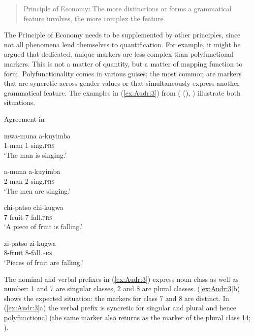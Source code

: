 \documentclass[output=collectionpaper]{langsci/langscibook}
\begin{document}
\begin{quote}
Principle of Economy: The more distinctions or forms a grammatical feature involves, the more complex the feature.
\end{quote}

The Principle of Economy needs to be supplemented by other principles, since not all phenomena lend themselves to quantification. For example, it might be argued that dedicated, unique markers are less complex than polyfunctional markers. This is not a matter of quantity, but a matter of mapping function to form. Polyfunctionality comes in various guises; the most common are markers that are syncretic across gender values or that simultaneously express another grammatical feature. The examples in ‎(\ref{ex:Audr:3}) from  ( (), \citealt{Bentley2001}) illustrate both situations.

\ea
\label{ex:Audr:3}
Agreement in \\
\begin{xlist}
\ex
\begin{minipage}[t]{0.4\textwidth}
\gll mwa-muna a-kuyimba\\
     1-man 1-sing.\textsc{prs} \\
\glt `The man is singing.'\\
\end{minipage}%
\begin{minipage}[t]{0.4\textwidth}
\gll a-muna a-kuyimba\\
     2-man 2-sing.\textsc{prs}\\
\glt `The men are singing.'
\end{minipage}
\ex
\begin{minipage}[t]{0.4\textwidth}
\gll chi-patso chi-kugwa  \\
     7-fruit 7-fall.\textsc{prs}\\
\glt `A piece of fruit is falling.'\\
\end{minipage}%
\begin{minipage}[t]{0.4\textwidth}
\gll zi-patso zi-kugwa\\
     8-fruit 8-fall.\textsc{prs}\\
\glt  `Pieces of fruit are falling.'
\end{minipage}
\end{xlist}
\z

The nominal and verbal prefixes in ‎(\ref{ex:Audr:3}) express noun class as well as number: 1 and 7 are singular classes, 2 and 8 are plural classes. ‎(\ref{ex:Audr:3}b) shows the expected situation: the markers for class 7 and 8 are distinct. In ‎(\ref{ex:Audr:3}a) the verbal prefix is syncretic for singular and plural and hence polyfunctional (the same marker also returns as the marker of the plural class 14; \citealt[6]{Mchombo2004}).
\end{document}
